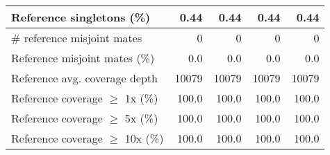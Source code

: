 \documentclass[12pt,a4paper]{article}
\begin{document}
\begin{table}[ht]
\begin{center}
\begin{tabular}{|l*{4}{|r}|}
Reference singletons (\%) & 0.44 & 0.44 & 0.44 & 0.44 \\ \hline
\# reference misjoint mates & 0 & 0 & 0 & 0 \\ \hline
Reference misjoint mates (\%) & 0.0 & 0.0 & 0.0 & 0.0 \\ \hline
Reference avg. coverage depth & 10079 & 10079 & 10079 & 10079 \\ \hline
Reference coverage $\geq$ 1x (\%) & 100.0 & 100.0 & 100.0 & 100.0 \\ \hline
Reference coverage $\geq$ 5x (\%) & 100.0 & 100.0 & 100.0 & 100.0 \\ \hline
Reference coverage $\geq$ 10x (\%) & 100.0 & 100.0 & 100.0 & 100.0 \\ \hline
\end{tabular}
\end{center}
\end{table}
\end{document}

